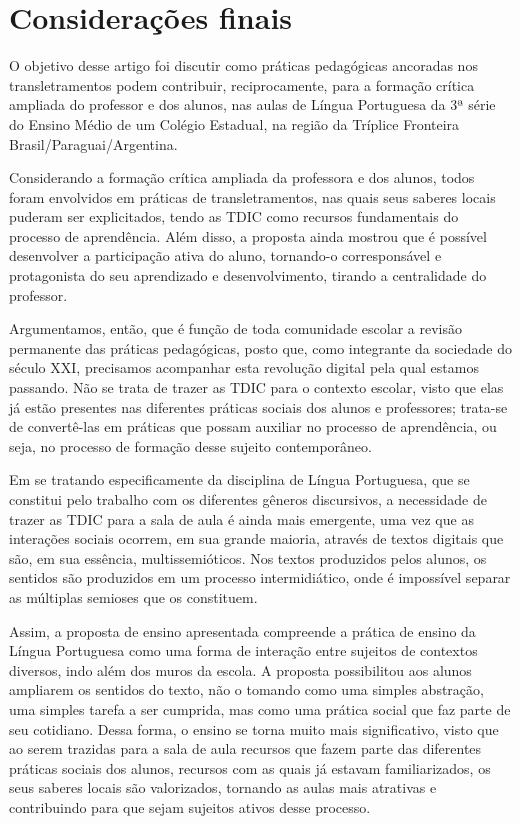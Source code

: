 \documentclass{textolivre}
\begin{document}
\section{Considerações finais}\label{sec-consideracoes}
O objetivo desse artigo foi discutir como práticas pedagógicas ancoradas nos transletramentos podem contribuir, reciprocamente, para a formação crítica ampliada do professor e dos alunos, nas aulas de Língua Portuguesa da 3ª série do Ensino Médio de um Colégio Estadual, na região da Tríplice Fronteira Brasil/Paraguai/Argentina.

Considerando a formação crítica ampliada da professora e dos alunos, todos foram envolvidos em práticas de transletramentos, nas quais seus saberes locais puderam ser explicitados, tendo as TDIC como recursos fundamentais do processo de aprendência. Além disso, a proposta ainda mostrou que é possível desenvolver a participação ativa do aluno, tornando-o corresponsável e protagonista do seu aprendizado e desenvolvimento, tirando a centralidade do professor.

Argumentamos, então, que é função de toda comunidade escolar a revisão permanente das práticas pedagógicas, posto que, como integrante da sociedade do século XXI, precisamos acompanhar esta revolução digital pela qual estamos passando. Não se trata de trazer as TDIC para o contexto escolar, visto que elas já estão presentes nas diferentes práticas sociais dos alunos e professores; trata-se de convertê-las em práticas que possam auxiliar no processo de aprendência, ou seja, no processo de formação desse sujeito contemporâneo.

Em se tratando especificamente da disciplina de Língua Portuguesa, que se constitui pelo trabalho com os diferentes gêneros discursivos, a necessidade de trazer as TDIC para a sala de aula é ainda mais emergente, uma vez que as interações sociais ocorrem, em sua grande maioria, através de textos digitais que são, em sua essência, multissemióticos. Nos textos produzidos pelos alunos, os sentidos são produzidos em um processo intermidiático, onde é impossível separar as múltiplas semioses que os constituem.

Assim, a proposta de ensino apresentada compreende a prática de ensino da Língua Portuguesa como uma forma de interação entre sujeitos de contextos diversos, indo além dos muros da escola. A proposta possibilitou aos alunos ampliarem os sentidos do texto, não o tomando como uma simples abstração, uma simples tarefa a ser cumprida, mas como uma prática social que faz parte de seu cotidiano. Dessa forma, o ensino se torna muito mais significativo, visto que ao serem trazidas para a sala de aula recursos que fazem parte das diferentes práticas sociais dos alunos, recursos com as quais já estavam familiarizados, os seus saberes locais são valorizados, tornando as aulas mais atrativas e contribuindo para que sejam sujeitos ativos desse processo.
\end{document}
